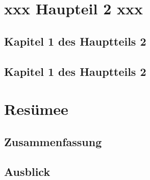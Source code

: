 \documentclass[
    fontsize=10pt,    %
    a4paper,      %
    parskip=half-,    %
    twoside,      %
    headings=big,  %
    appendixprefix=true,
    ]{scrreprt}    %
\begin{document}
\cleardoublepage
\part{xxx Haupteil 2 xxx}\label{part:xxx-haupteil2-xxx}


%

\chapter{Kapitel 1 des Hauptteils 2}\label{chapter:xxxname21xxx}
%

\chapter{Kapitel 1 des Hauptteils 2}\label{chapter:xxxname22xxx}
%







\cleardoublepage



\part{Resümee}\label{part:resumee}

\chapter{Zusammenfassung}
%

\chapter{Ausblick}
%
\end{document}
